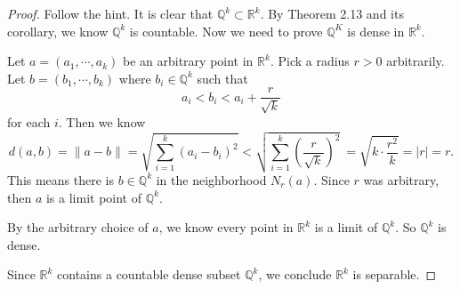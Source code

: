 \begin{Exercise}
\begin{proof}
Follow the hint. It is clear that $\mathbb{Q}^k\subset\mathbb{R}^k$. By Theorem 2.13 and its corollary, we know $\mathbb{Q}^k$ is countable. Now we need to prove $\mathbb{Q}^K$ is dense in $\mathbb{R}^k$.

Let $a = (a_1,\cdots, a_k)$ be an arbitrary point in $\mathbb{R}^k$. Pick a radius $r > 0$ arbitrarily. Let $b = (b_1,\cdots, b_k)$ where $b_i\in\mathbb{Q}^k$ such that
$$
a_i < b_i < a_i+\frac{r}{\sqrt{k}}
$$
for each $i$. Then we know
$$
d(a,b)
= \|a - b \| 
= \sqrt{\sum_{i=1}^{k} (a_i-b_i)^2} 
< \sqrt{\sum_{i=1}^{k} \left( \frac{r}{\sqrt{k}} \right)^2} \ 
= \sqrt{k\cdot\frac{r^2}{k}}  
= |r|
= r.
$$
This means there is $b\in\mathbb{Q}^k$ in the neighborhood $N_r(a)$. Since $r$ was arbitrary, then $a$ is a limit point of $\mathbb{Q}^k$.

By the arbitrary choice of $a$, we know every point in $\mathbb{R}^k$ is a limit of $\mathbb{Q}^k$. So $\mathbb{Q}^k$ is dense.

Since $\mathbb{R}^k$ contains a countable dense subset $\mathbb{Q}^k$, we conclude $\mathbb{R}^k$ is separable.
\end{proof}
\end{Exercise}